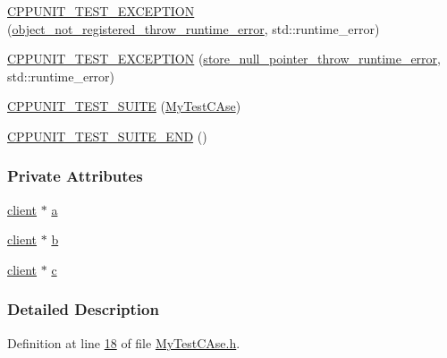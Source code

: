 \begin{DoxyCompactItemize}
\item 
\hyperlink{class_my_test_c_ase_a859adfd9c5b8837b2a5a5acc49a6feae_a859adfd9c5b8837b2a5a5acc49a6feae}{C\+P\+P\+U\+N\+I\+T\+\_\+\+T\+E\+S\+T\+\_\+\+E\+X\+C\+E\+P\+T\+I\+ON} (\hyperlink{class_my_test_c_ase_aa3a8c942db63dcf082f85013b7a09ee1_aa3a8c942db63dcf082f85013b7a09ee1}{object\+\_\+not\+\_\+registered\+\_\+throw\+\_\+runtime\+\_\+error}, std\+::runtime\+\_\+error)
\item 
\hyperlink{class_my_test_c_ase_ac738d6c87d7816318eb66d21adddba1a_ac738d6c87d7816318eb66d21adddba1a}{C\+P\+P\+U\+N\+I\+T\+\_\+\+T\+E\+S\+T\+\_\+\+E\+X\+C\+E\+P\+T\+I\+ON} (\hyperlink{class_my_test_c_ase_aae8eeb07dfdc5411255b064bc57b855d_aae8eeb07dfdc5411255b064bc57b855d}{store\+\_\+null\+\_\+pointer\+\_\+throw\+\_\+runtime\+\_\+error}, std\+::runtime\+\_\+error)
\item 
\hyperlink{class_my_test_c_ase_a58a546b24e4fb77be2a7b277efa40dc4_a58a546b24e4fb77be2a7b277efa40dc4}{C\+P\+P\+U\+N\+I\+T\+\_\+\+T\+E\+S\+T\+\_\+\+S\+U\+I\+TE} (\hyperlink{class_my_test_c_ase}{My\+Test\+C\+Ase})
\item 
\hyperlink{class_my_test_c_ase_adccb5bad07847e68427e9fd919cb45b6_adccb5bad07847e68427e9fd919cb45b6}{C\+P\+P\+U\+N\+I\+T\+\_\+\+T\+E\+S\+T\+\_\+\+S\+U\+I\+T\+E\+\_\+\+E\+ND} ()
\end{DoxyCompactItemize}
\subsubsection*{Private Attributes}
\begin{DoxyCompactItemize}
\item 
\hyperlink{classclient}{client} $\ast$ \hyperlink{class_my_test_c_ase_a08f3a55850ffce171406f81f2f6c9c74_a08f3a55850ffce171406f81f2f6c9c74}{a}
\item 
\hyperlink{classclient}{client} $\ast$ \hyperlink{class_my_test_c_ase_a2bc5d9aab740678cb8a81ee945ed5dfb_a2bc5d9aab740678cb8a81ee945ed5dfb}{b}
\item 
\hyperlink{classclient}{client} $\ast$ \hyperlink{class_my_test_c_ase_a9b2a4413041a47316ddc140e862e3bcc_a9b2a4413041a47316ddc140e862e3bcc}{c}
\end{DoxyCompactItemize}


\subsubsection{Detailed Description}


Definition at line \hyperlink{_my_test_c_ase_8h_source_l00018}{18} of file \hyperlink{_my_test_c_ase_8h_source}{My\+Test\+C\+Ase.\+h}.



